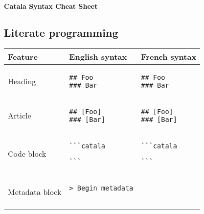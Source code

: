 \documentclass[a3paper,landscape]{article}
\begin{document}
\begin{center}
\Huge\bfseries\sffamily
Catala Syntax Cheat Sheet
\end{center}

\begin{multicols*}{2}





\section*{Literate programming}
\begin{center}
\begin{tabular}{p{}p{}p{}}
\toprule
Feature&English syntax&French syntax\\\midrule
Heading&
\vspace*{-1.7em}
\begin{verbatim}
## Foo
### Bar
\end{verbatim}
\vspace*{-1.7em}
&
\vspace*{-1.7em}
\begin{verbatim}
## Foo
### Bar
\end{verbatim}
\vspace*{-1.7em}
\\
Article&
\vspace*{-1.7em}
\begin{verbatim}
## [Foo]
### [Bar]
\end{verbatim}
\vspace*{-1.7em}
&
\vspace*{-1.7em}
\begin{verbatim}
## [Foo]
### [Bar]
\end{verbatim}
\vspace*{-1.7em}
\\
Code block&
\vspace*{-1.7em}
\begin{verbatim}
```catala

```
\end{verbatim}
\vspace*{-1.7em}
&
\vspace*{-1.7em}
\begin{verbatim}
```catala

```
\end{verbatim}
\vspace*{-1.7em}
\\
Metadata block&
\vspace*{-1.7em}
\begin{verbatim}
> Begin metadata


\end{verbatim}
\end{tabular}
\end{center}
\end{multicols*}
\end{document}
